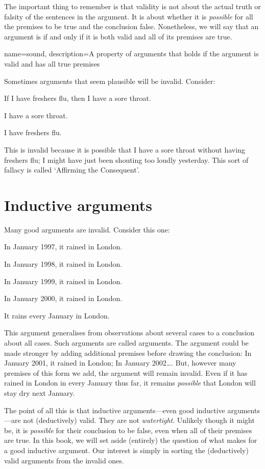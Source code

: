 The important thing to remember is that validity is not about the actual truth or falsity of the sentences in the argument. It is about whether it is \emph{possible} for all the premises to be true and the conclusion false. Nonetheless, we will say that an argument is  if and only if it is both valid and all of its premises are true.

{
name=sound,
description={A property of arguments that holds if the argument is valid and has all true premises}
}

Sometimes arguments that seem plausible will be invalid. Consider:
\begin{earg}
\item[]	If I have freshers flu, then I have a sore throat.
\item[]	I have a sore throat.
\item[\therefore]	I have freshers flu.
\end{earg}
This is invalid because it is possible that I have a sore throat without having freshers flu; I might have just been shouting too loudly yesterday. This sort of fallacy is called `Affirming the Consequent'.


\section{Inductive arguments}
Many good arguments are invalid. Consider this one:
	\begin{earg}
		\item[] In January 1997, it rained in London.
		\item[] In January 1998, it rained in London.
		\item[] In January 1999, it rained in London.
		\item[] In January 2000, it rained in London.
	\item[\therefore] It rains every January in London.
\end{earg}
This argument generalises from observations about several cases to a conclusion about all cases. Such arguments are called  arguments. The argument could be made stronger by adding additional premises before drawing the conclusion: In January 2001, it rained in London; In January 2002\ldots. But, however many premises of this form we add, the argument will remain invalid. Even if it has rained in London in every January thus far, it remains \emph{possible} that London will stay dry next January.

The point of all this is that inductive arguments---even good inductive arguments---are not (deductively) valid. They are not \emph{watertight}. Unlikely though it might be, it is \emph{possible} for their conclusion to be false, even when all of their premises are true. In this book, we will set aside (entirely) the question of what makes for a good inductive argument. Our interest is simply in sorting the (deductively) valid arguments from the invalid ones.  




